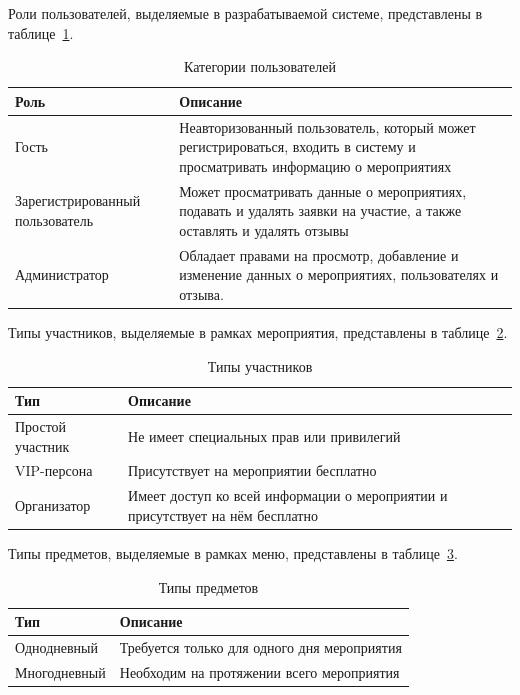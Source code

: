 Роли пользователей, выделяемые в разрабатываемой системе, представлены в таблице~\ref{tbl:user-roles}.

\begin{table}[h]
	\centering
	\caption{Категории пользователей}
	\begin{tabularx}{\textwidth}{|p{5cm}|X|}
		\hline
		\textbf{Роль} & \textbf{Описание} \\
		\hline
		Гость & Неавторизованный пользователь, который может регистрироваться, входить в систему и просматривать информацию о мероприятиях \\
		\hline
		Зарегистрированный пользователь & Может просматривать данные о мероприятиях, подавать и удалять заявки на участие, а также оставлять и удалять отзывы \\
		\hline
		Администратор & Обладает правами на просмотр, добавление и изменение данных о мероприятиях, пользователях и отзыва. \\
		\hline
	\end{tabularx}
	\label{tbl:user-roles}
\end{table}

Типы участников, выделяемые в рамках мероприятия, представлены в таблице~\ref{tbl:person-types}.

\begin{table}[h]
	\centering
	\caption{Типы участников}
	\begin{tabularx}{\textwidth}{|p{5cm}|X|}
		\hline
		\textbf{Тип} & \textbf{Описание} \\
		\hline
		Простой участник & Не имеет специальных прав или привилегий \\
		\hline
		VIP-персона & Присутствует на мероприятии бесплатно \\
		\hline
		Организатор & Имеет доступ ко всей информации о мероприятии и присутствует на нём бесплатно \\
		\hline
	\end{tabularx}
	\label{tbl:person-types}
\end{table}

\newpage

Типы предметов, выделяемые в рамках меню, представлены в таблице~\ref{tbl:items-types}.

\begin{table}[h]
	\centering
	\caption{Типы предметов}
	\begin{tabularx}{\textwidth}{|p{5cm}|X|}
		\hline
		\textbf{Тип} & \textbf{Описание} \\
		\hline
		Однодневный & Требуется только для одного дня мероприятия \\
		\hline
		Многодневный & Необходим на протяжении всего мероприятия \\
		\hline
	\end{tabularx}
	\label{tbl:items-types}
\end{table}

